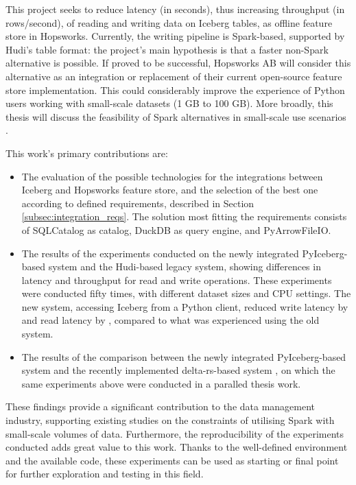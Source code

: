 This project seeks to reduce latency (in seconds), thus increasing throughput (in rows/second), of reading and writing data on Iceberg tables, as offline feature store in Hopsworks. Currently, the writing pipeline is Spark-based, supported by Hudi's table format: the project's main hypothesis is that a faster non-Spark alternative is possible. If proved to be successful, Hopsworks AB will consider this alternative as an integration or replacement of their current open-source feature store implementation. This could considerably improve the experience of Python users working with small-scale datasets (1 GB to 100 GB). More broadly, this thesis will discuss the feasibility of Spark alternatives in small-scale use scenarios \cite{manfrediReducingReadWrite2024}.


This work's primary contributions are:
\begin{itemize}
    \item The evaluation of the possible technologies for the integrations between Iceberg and Hopsworks feature store, and the selection of the best one according to defined requirements, described in Section \ref{subsec:integration_reqs}. The solution most fitting the requirements consists of SQLCatalog as catalog, DuckDB as query engine, and PyArrowFileIO.
    \item The results of the experiments conducted on the newly integrated PyIceberg-based system and the Hudi-based legacy system, showing differences in latency and throughput for read and write operations. These experiments were conducted fifty times, with different dataset sizes and \gls{CPU} settings. The new system, accessing Iceberg from a Python client, reduced write latency by  and read latency by , compared to what was experienced using the old system.
    \item The results of the comparison between the newly integrated PyIceberg-based system and the recently implemented delta-rs-based system \cite{manfrediReducingReadWrite2024}, on which the same experiments above were conducted in a paralled thesis work. 
\end{itemize}

These findings provide a significant contribution to the data management industry, supporting existing studies on the constraints of utilising Spark with small-scale volumes of data. Furthermore, the reproducibility of the experiments conducted adds great value to this work. Thanks to the well-defined environment and the available code, these experiments can be used as starting or final point for further exploration and testing in this field. 